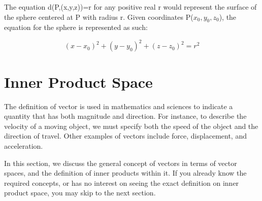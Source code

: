 \documentclass[../main.tex]{subfiles}
\begin{document}
The equation d(P,(x,y,z))=r for any positive real r would represent the surface of the sphere centered at P with radius r. Given coordinates P($x_0, y_0, z_0$), the equation for the sphere is represented as such:

$$(x-x_0)^2+(y-y_0)^2+(z-z_0)^2=r^2$$

\section{Inner Product Space}

The definition of vector is used in mathematics and sciences to indicate a quantity that has both magnitude and direction. For instance, to describe the velocity of a moving object, we must specify both the speed of the object and the direction of travel. Other examples of vectors include force, displacement, and acceleration.

In this section, we discuss the general concept of vectors in terms of vector spaces, and the definition of inner products within it. If you already know the required concepts, or has no interest on seeing the exact definition on inner product space, you may skip to the next section.



\end{document}
